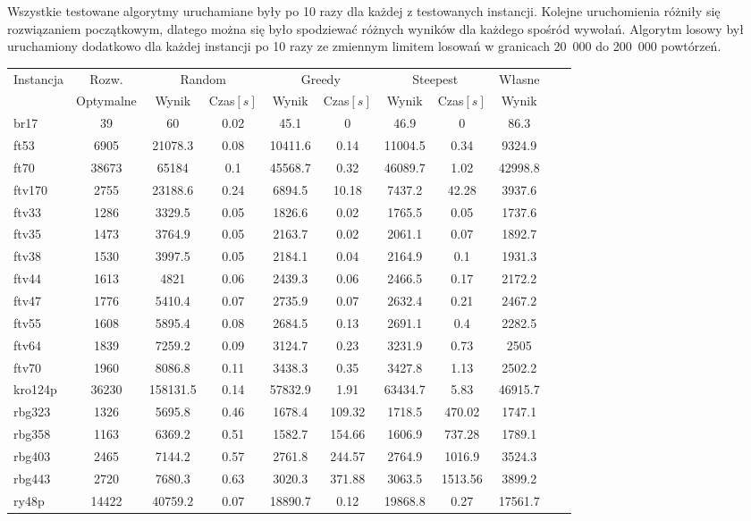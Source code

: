 Wszystkie testowane algorytmy uruchamiane
były po 10 razy dla każdej z testowanych instancji. Kolejne uruchomienia
różniły się rozwiązaniem początkowym, dlatego można się było spodziewać
różnych wyników dla każdego spośród wywołań. Algorytm 
losowy był uruchamiony dodatkowo dla każdej instancji po 10 razy ze zmiennym
limitem losowań w granicach 20~000 do 200~000 powtórzeń.

\begin{center}

\begin{tabular}{lcccccccccc}

\toprule
\multirow{2}{*}{Instancja} & {Rozw.} &
\multicolumn{2}{c}{Random} & \multicolumn{2}{c}{Greedy} &
\multicolumn{2}{c}{Steepest} & Własne\\
 &  Optymalne & Wynik & Czas$[s]$& Wynik & Czas$[s]$ & Wynik & Czas$[s]$& Wynik \\
\toprule
br17 & 39 & 60 & 0.02 & 45.1 & 0 & 46.9 & 0 & 86.3 \\
\midrule
ft53 & 6905 & 21078.3 & 0.08 & 10411.6 & 0.14 & 11004.5 & 0.34 & 9324.9 \\
\midrule
ft70 & 38673 & 65184 & 0.1 & 45568.7 & 0.32 & 46089.7 & 1.02 & 42998.8 \\
\midrule
ftv170 & 2755 & 23188.6 & 0.24 & 6894.5 & 10.18 & 7437.2 & 42.28 & 3937.6 \\
\midrule
ftv33 & 1286 & 3329.5 & 0.05 & 1826.6 & 0.02 & 1765.5 & 0.05 & 1737.6 \\
\midrule
ftv35 & 1473 & 3764.9 & 0.05 & 2163.7 & 0.02 & 2061.1 & 0.07 & 1892.7 \\
\midrule
ftv38 & 1530 & 3997.5 & 0.05 & 2184.1 & 0.04 & 2164.9 & 0.1 & 1931.3 \\
\midrule
ftv44 & 1613 & 4821 & 0.06 & 2439.3 & 0.06 & 2466.5 & 0.17 & 2172.2 \\
\midrule
ftv47 & 1776 & 5410.4 & 0.07 & 2735.9 & 0.07 & 2632.4 & 0.21 & 2467.2 \\
\midrule
ftv55 & 1608 & 5895.4 & 0.08 & 2684.5 & 0.13 & 2691.1 & 0.4 & 2282.5 \\
\midrule
ftv64 & 1839 & 7259.2 & 0.09 & 3124.7 & 0.23 & 3231.9 & 0.73 & 2505 \\
\midrule
ftv70 & 1960 & 8086.8 & 0.11 & 3438.3 & 0.35 & 3427.8 & 1.13 & 2502.2 \\
\midrule
kro124p & 36230 & 158131.5 & 0.14 & 57832.9 & 1.91 & 63434.7 & 5.83 & 46915.7 \\
\midrule
rbg323 & 1326 & 5695.8 & 0.46 & 1678.4 & 109.32 & 1718.5 & 470.02 & 1747.1 \\
\midrule
rbg358 & 1163 & 6369.2 & 0.51 & 1582.7 & 154.66 & 1606.9 & 737.28 & 1789.1 \\
\midrule
rbg403 & 2465 & 7144.2 & 0.57 & 2761.8 & 244.57 & 2764.9 & 1016.9 & 3524.3 \\
\midrule
rbg443 & 2720 & 7680.3 & 0.63 & 3020.3 & 371.88 & 3063.5 & 1513.56 & 3899.2 \\
\midrule
ry48p & 14422 & 40759.2 & 0.07 & 18890.7 & 0.12 & 19868.8 & 0.27 & 17561.7 \\
\bottomrule
\end{tabular}
\end{center}


